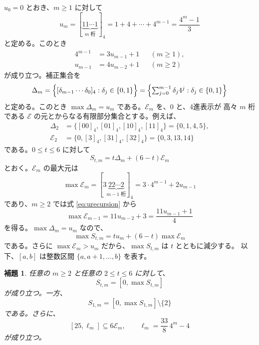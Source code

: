 \documentclass[12pt]{ltjsarticle}
\theoremstyle{plain}
\newtheorem{lemma}[theorem]{補題}
\begin{document}
$u_0=0$ とおき、$m\geq1$ に対して
\begin{equation}\label{eq:umdef}
 u_m=[\underbrace{11\cdots1}_{m\text{ 桁}}]_4
    =1+4+\cdots+4^{m-1}=\frac{4^m-1}{3}
\end{equation}
と定める。このとき
\begin{equation}\label{eq:urecursion}
\begin{aligned}
 4^{m-1}&=3u_{m-1}+1 &&(m\geq1),\\
 u_{m-1}&=4u_{m-2}+1 &&(m\geq2)
\end{aligned}
\end{equation}
が成り立つ。補正集合を
\[
 \Delta_m=\Bigl\{[\delta_{m-1}\cdots\delta_0]_4:\delta_j\in\{0,1\}\Bigr\}
    =\Bigl\{\textstyle\sum_{j=0}^{m-1}\delta_j4^j:\delta_j\in\{0,1\}\Bigr\}
\]
と定める。このとき $\max\Delta_m=u_m$ である。$\mathcal E_m$ を、$0$ と、4進表示が
高々 $m$ 桁である $\mathcal E$ の元とからなる有限部分集合とする。例えば、
\[
\begin{aligned}
 \Delta_2&=\{[00]_4,[01]_4,[10]_4,[11]_4\}=\{0,1,4,5\},\\
 \mathcal E_2&=\{0,[3]_4,[31]_4,[32]_4\}=\{0,3,13,14\}
\end{aligned}
\]
である。$0\leq t\leq6$ に対して
\begin{equation}\label{eq:S-t-m}
  S_{t,m}=t\Delta_m+(6-t)\mathcal E_m
\end{equation}
とおく。$\mathcal E_m$ の最大元は
\[
 \max\mathcal E_m=[3\underbrace{22\cdots2}_{m-1\text{ 桁}}]_4
                =3\cdot4^{m-1}+2u_{m-1}
\]
であり、$m\geq2$ では式 \eqref{eq:urecursion} から
\begin{equation}\label{eq:maxErecursion}
 \max\mathcal E_{m-1}=11u_{m-2}+3=\frac{11u_{m-1}+1}{4}
\end{equation}
を得る。$\max\Delta_m=u_m$ なので、
\begin{equation}\label{eq:maxStm}
 \max S_{t,m}=tu_m+(6-t)\max\mathcal E_m
\end{equation}
である。さらに $\max\mathcal E_m>u_m$ だから、$\max S_{t,m}$ は $t$ とともに減少する。
以下、$[a,b]$ は整数区間 $\{a,a+1,\ldots,b\}$ を表す。

\begin{lemma}\label{lem:mixed}
任意の $m\geq2$ と任意の $2\leq t\leq6$ に対して、
\begin{equation}\label{eq:mixedtge}
 S_{t,m}=[0,\max S_{t,m}]
\end{equation}
が成り立つ。一方、
\begin{equation}\label{eq:mixedtone}
 S_{1,m}=[0,\max S_{1,m}]\setminus\{2\}
\end{equation}
である。さらに、
\begin{equation}\label{eq:mixedEminterval}
 [25,\ell_m]\subseteq6\mathcal E_m,
 \qquad \ell_m=\frac{33}{8}\,4^m-4
\end{equation}
が成り立つ。
\end{lemma}
\end{document}
